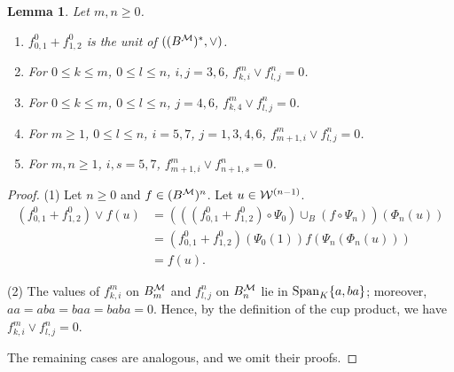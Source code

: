 \documentclass[10pt, reqno]{amsart}
\newtheorem{lem}[theorem]{Lemma}
\theoremstyle{definition}
\theoremstyle{remark}
\numberwithin{equation}{section}
\begin{document}
\begin{lem}\label{lem: zero cup product in cohomology}
   Let $m,n\ge 0$.
    \begin{enumerate}
        \item \(f_{0,1}^0+f_{1,2}^0\) is the unit of \(((B^{\mathcal{M}})^*, \lor)\).
        \item For \(0\le k\le m\), \(0\le l\le n\), \(i,j=3,6\), \(f_{k,i}^m \lor f_{l,j}^n=0\).
        \item For \(0\le k\le m\), \(0\le l\le n\), \(j=4,6\), \(f_{k,4}^m \lor f_{l,j}^n=0\).
        \item For \(m\ge 1\), \(0\le l \le n\), \(i=5,7\), \(j=1,3,4,6\), \(f_{m+1,i}^m \lor f_{l,j}^n=0\). 
        \item For \(m,n\ge 1\), \(i,s=5,7\), \(f_{m+1,i}^m \lor f_{n+1,s}^n=0\).
    \end{enumerate}
\end{lem}
\begin{proof}
    (1) Let $n\ge 0$ and $f\in (B^{\mathcal{M}})^n $. Let \(u\in \mathcal{W}^{(n-1)}\).
       \[
\begin{aligned}
(f_{0,1}^0+f_{1,2}^0)\lor f(u)
&= (((f_{0,1}^0+f_{1,2}^0)\circ \Psi_0)\cup_B (f\circ\Psi_n)) (\Phi_n(u))\\
&= (f_{0,1}^0+f_{1,2}^0) (\Psi_0(1))  f(\Psi_n(\Phi_n(u)))\\
&= f(u).
\end{aligned}
\]

(2) The values of \(f_{k,i}^m\) on \(B_m^{\mathcal{M}}\) and \(f_{l,j}^n\) on \(B_n^{\mathcal{M}}\) lie in \(\mathrm{Span}_K\{a,ba\}\); moreover, \(aa=aba=baa=baba=0\). Hence, by the definition of the cup product, we have  \(f_{k,i}^m \lor f_{l,j}^n=0\).


The remaining cases are analogous, and we omit their proofs.

 \end{proof}
 
\end{document}
